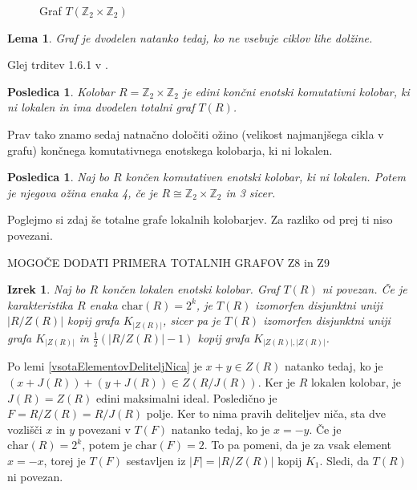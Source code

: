 \documentclass[a4paper, 12pt]{amsart}
\theoremstyle{definition} %
\theoremstyle{plain} %
\newtheorem{lema}[definicija]{Lema}
\newtheorem{izrek}[definicija]{Izrek}
\newtheorem{posledica}[definicija]{Posledica}
\newcommand{\Z}{\mathbb Z}
\begin{document}
\begin{figure}[h!]
\centering
{}
\caption{Graf $T(\Z_2 \times \Z_2)$}
\label{T(Z2xZ2)}
\end{figure}

\begin{lema}
Graf je dvodelen natanko tedaj, ko ne vsebuje ciklov lihe dolžine.
\end{lema}

\proof
Glej trditev 1.6.1 v \cite{Diestel}.
\endproof

\begin{posledica}
Kolobar $R=\Z_2 \times \Z_2$ je edini končni enotski komutativni kolobar, ki ni lokalen in ima dvodelen totalni graf $T(R)$.
\end{posledica}

Prav tako znamo sedaj natnačno določiti ožino (velikost najmanjšega cikla v grafu) končnega komutativnega enotskega kolobarja, ki ni lokalen.

\begin{posledica}
Naj bo $R$ končen komutativen enotski kolobar, ki ni lokalen. Potem je njegova ožina enaka 4, če je $R \cong \Z_2 \times \Z_2$ in 3 sicer.
\end{posledica}

Poglejmo si zdaj še totalne grafe lokalnih kolobarjev. Za razliko od prej ti niso povezani.

MOGOČE DODATI PRIMERA TOTALNIH GRAFOV  Z8 in Z9

\begin{izrek}
\label{klasifikacijaT(R)zaLokalenKolobar}
Naj bo $R$ končen lokalen enotski kolobar. Graf $T(R)$ ni povezan. Če je karakteristika $R$ enaka $\textrm{char} (R) = 2^k$, je $T(R)$ izomorfen disjunktni uniji $|R/Z(R)|$ kopij grafa $K_{|Z(R)|}$, sicer pa je $T(R)$ izomorfen disjunktni uniji grafa $K_{|Z(R)|}$ in $\frac{1}{2}(|R/Z(R)| - 1)$ kopij grafa    $K_{|Z(R)|, |Z(R)|}$.
\end{izrek}

\proof
Po lemi \ref{vsotaElementovDeliteljNica} je $x+y \in Z(R)$ natanko tedaj, ko  je $(x+J(R)) + (y+J(R))  \in Z(R/J(R))$. Ker je $R$ lokalen kolobar, je $J(R) = Z(R)$ edini maksimalni ideal. Posledično je $ F = R/Z(R) = R/J(R)$ polje. Ker to nima pravih deliteljev niča, sta dve vozlišči $x$ in $y$ povezani v $T(F)$ natanko tedaj, ko je $x=-y$. 
Če je $\textrm{char}(R) = 2^k$, potem je $\textrm{char}(F) = 2$. To pa pomeni, da je za vsak element $x = -x$, torej je $T(F)$ sestavljen iz $|F| = |R/Z(R)|$ kopij $K_1$. Sledi, da $T(R)$ ni povezan.
\end{document}
